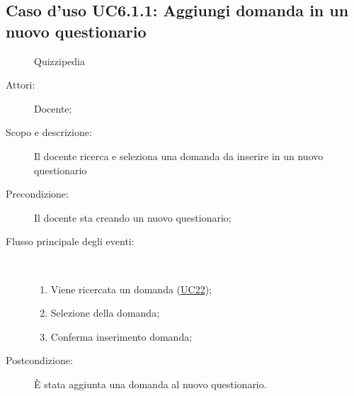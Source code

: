 \subsection{Caso d'uso UC6.1.1: Aggiungi domanda in un nuovo questionario }
	\begin{figure}[H]
		\centering
		\begin{resizedtikzpicture}{\textwidth}
		\begin{umlsystem}[x=0, fill=lightgray!20]{Quizzipedia}
		\end{umlsystem}
		\end{resizedtikzpicture}
		\caption{}
	\end{figure}
\begin{description}
\item[Attori:] Docente;
\item[Scopo e descrizione:] Il docente ricerca e seleziona una domanda da inserire in un nuovo questionario
      \item[Precondizione:] Il docente sta creando un nuovo questionario;

        \item[Flusso principale degli eventi:] \ 
 \begin{enumerate}
          \item Viene ricercata un domanda (\hyperlink{UC22}{UC22});
          \item Selezione della domanda;
          \item Conferma inserimento domanda;

      \end{enumerate}
    \item[Postcondizione:] È stata aggiunta una domanda al nuovo questionario.
  \end{description}
\hypertarget{UC6.1.2}{}
